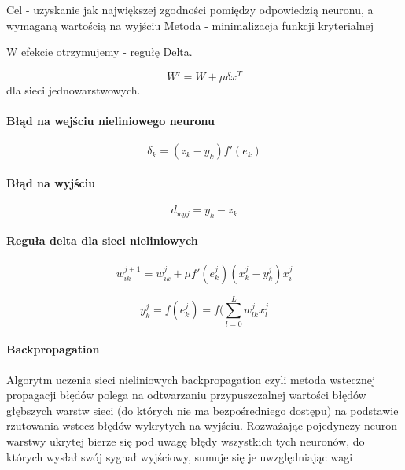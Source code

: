 Cel - uzyskanie jak największej zgodności pomiędzy odpowiedzią neuronu, a wymaganą wartością na wyjściu
Metoda - minimalizacja funkcji kryterialnej

W efekcie otrzymujemy - regułę Delta.

\begin{equation}
 W' = W + \mu \delta x^T
\end{equation}
dla sieci jednowarstwowych.

\paragraph{Błąd na wejściu nieliniowego neuronu}
\begin{equation}
 \delta_k = (z_k - y_k) f'(e_k)
\end{equation}

\paragraph{Błąd na wyjściu}
\begin{equation}
 d_{wyj} = y_k - z_k
\end{equation}

\paragraph{Reguła delta dla sieci nieliniowych}

\begin{equation}
 w_{ik}^{j+1} = w_{ik}^j + \mu f'(e_k^j) (x_k^j - y_k^j) x_i^j
\end{equation}

\begin{equation}
 y_k^j = f(e_k^j) = f(\sum_{l=0}^L w_{lk}^j x_l^j
\end{equation}

\paragraph{Backpropagation}

Algorytm uczenia sieci nieliniowych backpropagation 
czyli metoda wstecznej propagacji błędów polega na 
odtwarzaniu przypuszczalnej wartości błędów głębszych 
warstw sieci (do których nie ma bezpośredniego dostępu) 
na podstawie rzutowania wstecz błędów wykrytych na 
wyjściu. Rozważając pojedynczy neuron warstwy ukrytej 
bierze się pod uwagę błędy wszystkich tych neuronów, 
do których wysłał swój sygnał wyjściowy, sumuje się je 
uwzględniając wagi

